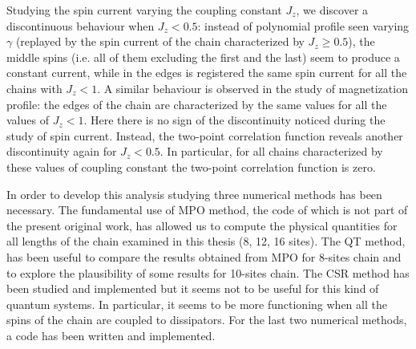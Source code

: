 Studying the spin current varying the coupling constant $J_z$, we discover a discontinuous behaviour when $J_z < 0.5$: instead of polynomial profile seen varying $\gamma$ (replayed by the spin current of the chain characterized by $J_z \geq 0.5$), the middle spins (i.e. all of them excluding the first and the last) seem to produce a constant current, while in the edges is registered the same spin current for all the chains with $J_z < 1$. A similar behaviour is observed in the study of magnetization profile: the edges of the chain are characterized by the same values for all the values of $J_z < 1$. Here there is no sign of the discontinuity noticed during the study of spin current. Instead, the two-point correlation function reveals another discontinuity again for $J_z < 0.5$. In particular, for all chains characterized by these values of coupling constant the two-point correlation function is zero.

In order to develop this analysis studying three numerical methods has been necessary. The fundamental use of MPO method, the code of which is not part of the present original work, has allowed us to compute the physical quantities for all lengths of the chain examined in this thesis (8, 12, 16 sites). The QT method, has been useful to compare the results obtained from MPO for 8-sites chain and to explore the plausibility of some results for 10-sites chain. The CSR method has been studied and implemented but it seems not to be useful for this kind of quantum systems. In particular, it seems to be more functioning when all the spins of the chain are coupled to dissipators. For the last two numerical methods, a code has been written and implemented.

